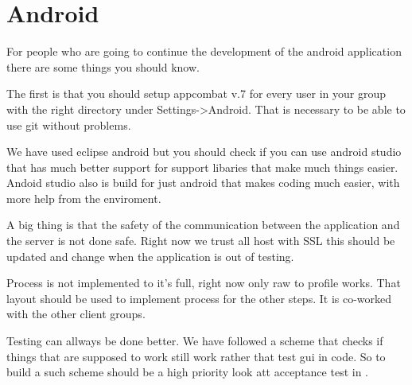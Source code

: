 \section{Android}
For people who are going to continue the development of the android application there are some things you should know.

The first is that you should setup appcombat v.7 for every user in your group with the right directory under Settings->Android. That is necessary to be able to use git without problems. 

We have used eclipse android but you should check if you can use android studio that has much better support for support libaries that make much things easier. Andoid studio also is build for just android that makes coding much easier, with more help from the enviroment.

A big thing is that the safety of the communication between the application and the server is not done safe. Right now we trust all host with SSL this should be updated and change when the application is out of testing. 

Process is not implemented to it's full, right now only raw to profile works. That layout should be used to implement process for the other steps. It is co-worked with the other client groups.

Testing can allways be done better. We have followed a scheme that checks if things that are supposed to work still work rather that test gui in code. So to build  a such scheme should be a high priority look att acceptance test in . 


